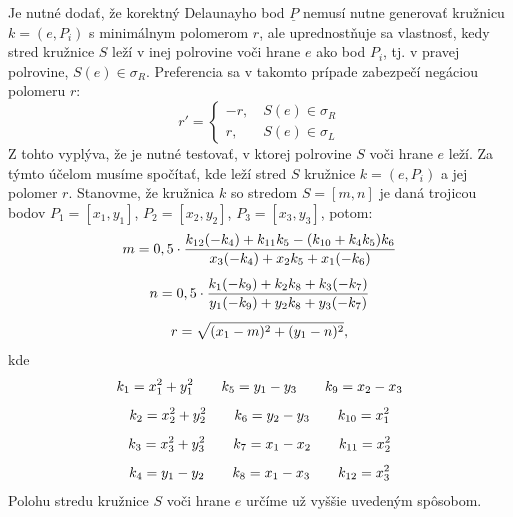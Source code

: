 \documentclass[11pt]{article}
\begin{document}
Je nutné dodať, že korektný Delaunayho bod $\underline{P}$ nemusí nutne generovať kružnicu $k = (e,P_i)$ s minimálnym polomerom $r$, ale uprednostňuje sa vlastnosť, kedy stred kružnice $S$ leží v inej polrovine voči hrane $e$ ako bod $P_i$, tj. v pravej polrovine, $S(e) \in \sigma_R$. Preferencia sa v takomto prípade zabezpečí negáciou polomeru $r$:
\begin{equation*}
r'=
\begin{cases}
    -r, \quad S(e) \in \sigma_R\\
    r, \quad \: \: \, \, S(e) \in \sigma_L
\end{cases}
\end{equation*}
\noindent Z tohto vyplýva, že je nutné testovať, v ktorej polrovine $S$ voči hrane $e$ leží. Za týmto účelom musíme spočítať, kde leží stred $S$ kružnice $k = (e,P_i)$ a jej polomer $r$. \newline
\newpage
\noindent Stanovme, že kružnica $k$ so stredom $S = [m, n]$ je daná trojicou bodov $P_1 = [x_1, y_1]$, $P_2 = [x_2, y_2]$, $P_3 = [x_3, y_3]$, potom:
\begin{equation*}
\openup 1ex
\begin{gathered}
\nonumber m = 0,5 \cdot \frac{k_{12}(-k_4)+k_{11}k_5 - (k_{10} + k_4k_5)k_6}{x_3(-k_4)+x_2k_5+x_1(-k_6)}\\
\nonumber n = 0,5 \cdot \frac{k_1(-k_9) + k_2k_8+k_3(-k_7)}{y_1(-k_9)+y_2k_8+y_3(-k_7)}\\
\nonumber r = \sqrt{(x_1 - m)^2 + (y_1 - n)^2},
\end{gathered}
\end{equation*}
kde
\begin{equation*}
\openup 1ex
\begin{gathered}
\nonumber k_1=x_1^2+y_1^2 \quad \quad k_5=y_1-y_3 \quad \quad k_9=x_2-x_3\\
\nonumber k_2=x_2^2+y_2^2 \quad \quad k_6=y_2-y_3 \quad \quad k_{10}=x_1^2\\
\nonumber k_3=x_3^2+y_3^2 \quad \quad k_7=x_1-x_2 \quad \quad k_{11}=x_2^2\\
\nonumber k_4=y_1-y_2 \quad \quad k_8=x_1-x_3 \quad \quad k_{12} = x_3^2
\end{gathered}
\end{equation*}
Polohu stredu kružnice $S$ voči hrane $e$ určíme už vyššie uvedeným spôsobom.
\end{document}
